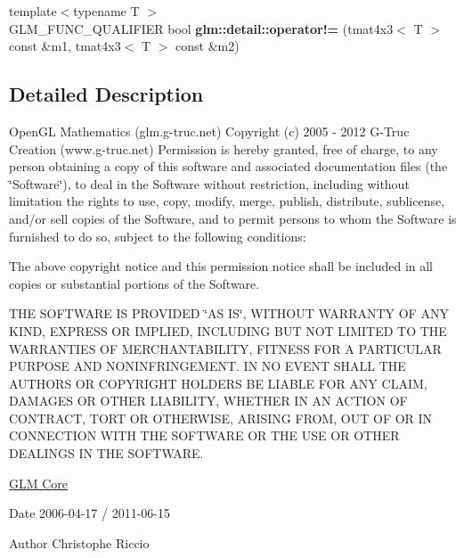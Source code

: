 \begin{DoxyCompactItemize}
\item 
\hypertarget{namespaceglm_1_1detail_aa2f6f4a87ab8f09da032bfa19b12c817}{{\footnotesize template$<$typename T $>$ }\\G\-L\-M\-\_\-\-F\-U\-N\-C\-\_\-\-Q\-U\-A\-L\-I\-F\-I\-E\-R bool {\bfseries glm\-::detail\-::operator!=} (tmat4x3$<$ T $>$ const \&m1, tmat4x3$<$ T $>$ const \&m2)}\label{namespaceglm_1_1detail_aa2f6f4a87ab8f09da032bfa19b12c817}

\end{DoxyCompactItemize}


\subsection{Detailed Description}
Open\-G\-L Mathematics (glm.\-g-\/truc.\-net) Copyright (c) 2005 -\/ 2012 G-\/\-Truc Creation (www.\-g-\/truc.\-net) Permission is hereby granted, free of charge, to any person obtaining a copy of this software and associated documentation files (the \char`\"{}\-Software\char`\"{}), to deal in the Software without restriction, including without limitation the rights to use, copy, modify, merge, publish, distribute, sublicense, and/or sell copies of the Software, and to permit persons to whom the Software is furnished to do so, subject to the following conditions\-:

The above copyright notice and this permission notice shall be included in all copies or substantial portions of the Software.

T\-H\-E S\-O\-F\-T\-W\-A\-R\-E I\-S P\-R\-O\-V\-I\-D\-E\-D \char`\"{}\-A\-S I\-S\char`\"{}, W\-I\-T\-H\-O\-U\-T W\-A\-R\-R\-A\-N\-T\-Y O\-F A\-N\-Y K\-I\-N\-D, E\-X\-P\-R\-E\-S\-S O\-R I\-M\-P\-L\-I\-E\-D, I\-N\-C\-L\-U\-D\-I\-N\-G B\-U\-T N\-O\-T L\-I\-M\-I\-T\-E\-D T\-O T\-H\-E W\-A\-R\-R\-A\-N\-T\-I\-E\-S O\-F M\-E\-R\-C\-H\-A\-N\-T\-A\-B\-I\-L\-I\-T\-Y, F\-I\-T\-N\-E\-S\-S F\-O\-R A P\-A\-R\-T\-I\-C\-U\-L\-A\-R P\-U\-R\-P\-O\-S\-E A\-N\-D N\-O\-N\-I\-N\-F\-R\-I\-N\-G\-E\-M\-E\-N\-T. I\-N N\-O E\-V\-E\-N\-T S\-H\-A\-L\-L T\-H\-E A\-U\-T\-H\-O\-R\-S O\-R C\-O\-P\-Y\-R\-I\-G\-H\-T H\-O\-L\-D\-E\-R\-S B\-E L\-I\-A\-B\-L\-E F\-O\-R A\-N\-Y C\-L\-A\-I\-M, D\-A\-M\-A\-G\-E\-S O\-R O\-T\-H\-E\-R L\-I\-A\-B\-I\-L\-I\-T\-Y, W\-H\-E\-T\-H\-E\-R I\-N A\-N A\-C\-T\-I\-O\-N O\-F C\-O\-N\-T\-R\-A\-C\-T, T\-O\-R\-T O\-R O\-T\-H\-E\-R\-W\-I\-S\-E, A\-R\-I\-S\-I\-N\-G F\-R\-O\-M, O\-U\-T O\-F O\-R I\-N C\-O\-N\-N\-E\-C\-T\-I\-O\-N W\-I\-T\-H T\-H\-E S\-O\-F\-T\-W\-A\-R\-E O\-R T\-H\-E U\-S\-E O\-R O\-T\-H\-E\-R D\-E\-A\-L\-I\-N\-G\-S I\-N T\-H\-E S\-O\-F\-T\-W\-A\-R\-E.

\hyperlink{group__core}{G\-L\-M Core}

\begin{DoxyDate}{Date}
2006-\/04-\/17 / 2011-\/06-\/15 
\end{DoxyDate}
\begin{DoxyAuthor}{Author}
Christophe Riccio 
\end{DoxyAuthor}
